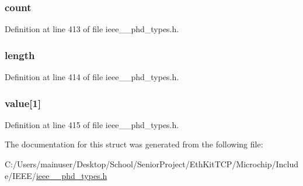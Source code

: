 \subsubsection[{count}]{ count}\label{struct___pm_segm_elem_static_attr_list_abf6db060ae8e224764b0f867fb135ecd}


Definition at line 413 of file ieee\+\_\+\_\+phd\+\_\+types.\+h.

\hypertarget{struct___pm_segm_elem_static_attr_list_a3743679e4ff85e3e1b3fc2e59973fbb3}{}
\subsubsection[{length}]{ length}\label{struct___pm_segm_elem_static_attr_list_a3743679e4ff85e3e1b3fc2e59973fbb3}


Definition at line 414 of file ieee\+\_\+\_\+phd\+\_\+types.\+h.

\hypertarget{struct___pm_segm_elem_static_attr_list_a4c70f7dda06f89fc5097a04d0fc0a178}{}
\subsubsection[{value}]{ value\mbox{[}1\mbox{]}}\label{struct___pm_segm_elem_static_attr_list_a4c70f7dda06f89fc5097a04d0fc0a178}


Definition at line 415 of file ieee\+\_\+\_\+phd\+\_\+types.\+h.



The documentation for this struct was generated from the following file\+:\begin{DoxyCompactItemize}
\item 
C\+:/\+Users/mainuser/\+Desktop/\+School/\+Senior\+Project/\+Eth\+Kit\+T\+C\+P/\+Microchip/\+Include/\+I\+E\+E\+E/\hyperlink{ieee__11073__phd__types_8h}{ieee\+\_\+\_\+phd\+\_\+types.\+h}\end{DoxyCompactItemize}
